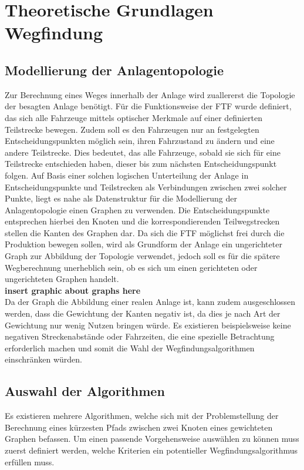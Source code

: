 \chapter{Theoretische Grundlagen Wegfindung}
	\label{Theorie}
\section{Modellierung der Anlagentopologie}
	\label{Graph_Anlage}
	Zur Berechnung eines Weges innerhalb der Anlage wird zuallererst die Topologie der besagten Anlage benötigt. Für die Funktionsweise der \ac{FTF} wurde definiert, das sich alle Fahrzeuge mittels optischer Merkmale auf einer definierten Teilstrecke bewegen. Zudem soll es den Fahrzeugen nur an festgelegten Entscheidungspunkten möglich sein, ihren Fahrzustand zu ändern und eine andere Teilstrecke. Dies bedeutet, das alle Fahrzeuge, sobald sie sich für eine Teilstrecke entschieden haben, dieser bis zum nächsten Entscheidungspunkt folgen. Auf Basis einer solchen logischen Unterteilung der Anlage in Entscheidungspunkte und Teilstrecken als Verbindungen zwischen zwei solcher Punkte, liegt es nahe als Datenstruktur für die Modellierung der Anlagentopologie einen Graphen zu verwenden. Die Entscheidungspunkte entsprechen hierbei den Knoten und die korrespondierenden Teilwegstrecken stellen die Kanten des Graphen dar. Da sich die \ac{FTF} möglichst frei durch die Produktion bewegen sollen, wird als Grundform der Anlage ein ungerichteter Graph zur Abbildung der Topologie verwendet, jedoch soll es für die spätere Wegberechnung unerheblich sein, ob es sich um einen gerichteten oder ungerichteten Graphen handelt.\\
	\textbf{insert graphic about graphs here}\\
	Da der Graph die Abbildung einer realen Anlage ist, kann zudem ausgeschlossen werden, dass die Gewichtung der Kanten negativ ist, da dies je nach Art der Gewichtung nur wenig Nutzen bringen würde. Es existieren beispielsweise keine negativen Streckenabstände oder Fahrzeiten, die eine spezielle Betrachtung erforderlich machen und somit die Wahl der Wegfindungsalgorithmen einschränken würden.
	
\section{Auswahl der Algorithmen}

	Es existieren mehrere Algorithmen, welche sich mit der Problemstellung der Berechnung eines kürzesten Pfads zwischen zwei Knoten eines gewichteten Graphen befassen. Um einen passende Vorgehensweise auswählen zu können muss zuerst definiert werden, welche Kriterien ein potentieller Wegfindungsalgorithmus erfüllen muss.
	
